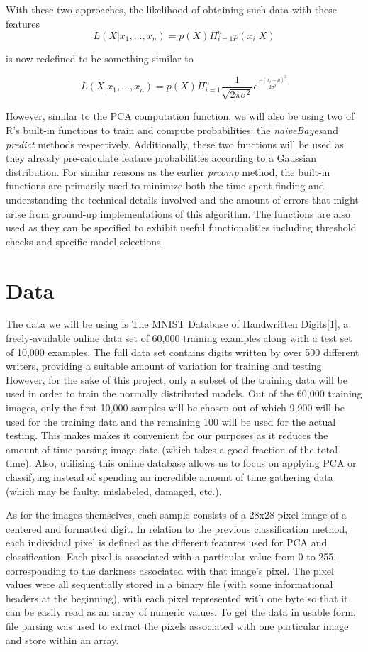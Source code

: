 \documentclass[twocolumn]{article}
\begin{document}
With these two approaches, the likelihood of obtaining such data with these features
$$L(X | x_1,\ldots, x_n ) = p(X) \Pi_{i=1}^{n}p(x_i | X)$$

is now redefined to be something similar to

$$L(X |  x_1,\ldots, x_n ) = p(X) \Pi_{i=1}^{n} \frac{1}{\sqrt{2 \pi \sigma^2}}  e^\frac{-(x_i - \mu)^2}{2 \sigma^2}$$

However, similar to the PCA computation function, we will also be using two of R's built-in functions to train and compute probabilities: the \emph{naiveBayes}and \emph{predict} methods respectively. Additionally, these two functions will be used as they already pre-calculate feature probabilities according to a Gaussian distribution. For similar reasons as the earlier \emph{prcomp} method, the built-in functions are primarily used to minimize both the time spent finding and understanding the technical details involved and the amount of errors that might arise from ground-up implementations of this algorithm. The functions are also used as they can be specified to exhibit useful functionalities including threshold checks and specific model selections.


\section{Data} %
\label{sec:data}
The data we will be using is The MNIST Database of Handwritten Digits[1], a freely-available online data set of 60,000 training examples along with a test set of 10,000 examples. The full data set contains digits written by over 500 different writers, providing a suitable amount of variation for training and testing. However, for the sake of this project, only a subset of the training data will be used in order to train the normally distributed models. Out of the 60,000 training images, only the first 10,000 samples will be chosen out of which 9,900 will be used for the training data and the remaining 100 will be used for the actual testing. This makes makes it convenient for our purposes as it reduces the amount of time parsing image data (which takes a good fraction of the total time). Also, utilizing this online database allows us to focus on applying PCA or classifying instead of spending an incredible amount of time gathering data (which may be faulty, mislabeled, damaged, etc.). 

As for the images themselves, each sample consists of a 28x28 pixel image of a centered and formatted digit. In relation to the previous classification method, each individual pixel is defined as the different features used for PCA and classification. Each pixel is associated with a particular value from 0 to 255, corresponding to the darkness associated with that image's pixel. The pixel values were all sequentially stored in a binary file (with some informational headers at the beginning), with each pixel represented with one byte so that it can be easily read as an array of numeric values. To get the data in usable form, file parsing was used to extract the pixels associated with one particular image and store within an array.
\end{document}
